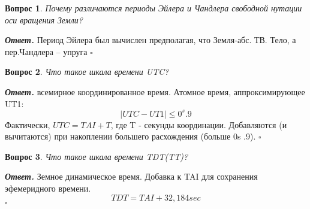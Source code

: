\documentclass[12pt]{article}
\newtheorem{problem}{Вопрос}
\newenvironment{solution}[1][\it{Ответ}]{\textbf{#1. } }{$\square$}
\begin{document}
		\begin{problem}
			Почему различаются
			периоды Эйлера и Чандлера
			свободной нутации оси
			вращения Земли?
		\end{problem}
		
		\begin{solution}
			Период
			Эйлера был вычислен
			предполагая, что Земля-абс. ТВ.
			Тело, а пер.Чандлера – упруга	
		\end{solution}
		
		\begin{problem}
			Что такое шкала времени
			UTC?
		\end{problem}
		
		\begin{solution}
			всемирное координированное время. Атомное время, аппроксимирующее UT1: $$|UTC - UT1| \le 0^s .9 $$
			Фактически, $UTC = TAI + T$, где T - секунды координации. Добавляются (и вычитаются) при накоплении
			большего расхождения (больше 0s .9).		
		\end{solution}
		
		\begin{problem}
			Что такое шкала времени
			TDT(TT)?
		\end{problem}
		
		\begin{solution}
		Земное динамическое время. Добавка к TAI для сохранения эфемеридного времени.
		$$TDT=TAI+32,184 sec$$	
		\end{solution}
		
		
\end{document}
